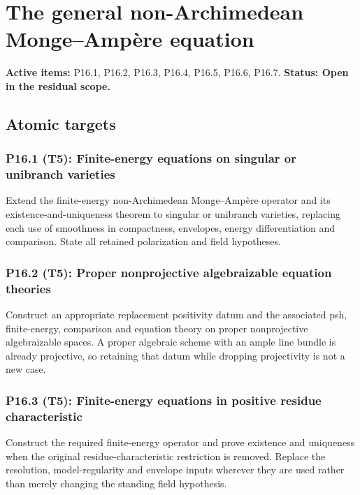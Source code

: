 \documentclass[11pt,a4paper]{article}
\theoremstyle{definition}
\theoremstyle{remark}
\begin{document}
\clearpage\section{The general non-Archimedean Monge--Ampère equation}
\label{family:10}
\noindent\textbf{Active items:} P16.1, P16.2, P16.3, P16.4, P16.5, P16.6, P16.7. \textbf{Status: Open in the residual scope.}

\subsection{Atomic targets}
\subsubsection*{P16.1 (T5): Finite-energy equations on singular or unibranch varieties}
\label{atom:P16.1}
Extend the finite-energy non-Archimedean Monge--Ampère operator and its existence-and-uniqueness theorem to singular or unibranch varieties, replacing each use of smoothness in compactness, envelopes, energy differentiation and comparison. State all retained polarization and field hypotheses.

\subsubsection*{P16.2 (T5): Proper nonprojective algebraizable equation theories}
\label{atom:P16.2}
Construct an appropriate replacement positivity datum and the associated psh, finite-energy, comparison and equation theory on proper nonprojective algebraizable spaces. A proper algebraic scheme with an ample line bundle is already projective, so retaining that datum while dropping projectivity is not a new case.

\subsubsection*{P16.3 (T5): Finite-energy equations in positive residue characteristic}
\label{atom:P16.3}
Construct the required finite-energy operator and prove existence and uniqueness when the original residue-characteristic restriction is removed. Replace the resolution, model-regularity and envelope inputs wherever they are used rather than merely changing the standing field hypothesis.
\end{document}

